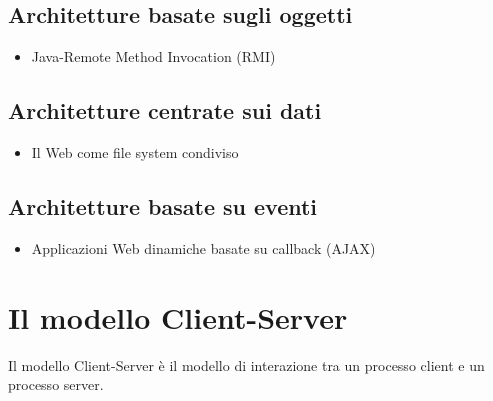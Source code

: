 \section{Architetture basate sugli oggetti}
\begin{itemize}
    \item Java-Remote Method Invocation (RMI)
\end{itemize}

\section{Architetture centrate sui dati}
\begin{itemize}
    \item Il Web come file system condiviso
\end{itemize}

\section{Architetture basate su eventi}
\begin{itemize}
    \item Applicazioni Web dinamiche basate su callback (AJAX)
\end{itemize}

\chapter{Il modello Client-Server}
Il modello Client-Server è il modello di interazione tra un processo client e un processo server.
